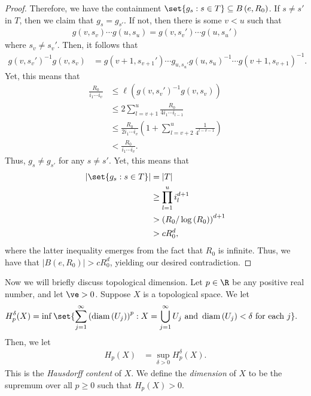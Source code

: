 \documentclass[10pt]{mypackage}
\begin{document}
\begin{proof}
  Therefore, we have the containment $\set{g_s : s\in T}\subseteq B\left( e,R_0 \right)$. If $s\neq s'$ in $T$, then we claim that $g_s = g_{s'}$. If not, then there is some $v < u$ such that 
  \begin{align*}
    g\left( v,s_v \right)\cdots g\left( u,s_u \right) = g\left( v,s_v' \right)\cdots g\left( u,s_u' \right)
  \end{align*}
  where $s_v \neq s_v'$. Then, it follows that
  \begin{align*}
    g\left( v,s_v' \right)^{-1}g\left( v,s_v \right) &= g\left( v+1,s_{v+1}' \right)\cdots g_{u,s_u'}g\left( u,s_u \right)^{-1}\cdots g\left( v+1,s_{v+1} \right)^{-1}.
  \end{align*}
  Yet, this means that
  \begin{align*}
    \frac{R_0}{i_1\cdots i_{v}} &\leq \ell\left( g\left( v,s_v' \right)^{-1}g\left( v,s_v \right) \right)\\
                                &\leq 2\sum_{l=v+1}^{u} \frac{R_0}{4i_1\cdots i_{l-1}}\\
                                &\leq \frac{R_0}{2i_1\cdots i_v}\left( 1 + \sum_{l=v+2}^{u}\frac{1}{4^{l-v-1}} \right)\\
                                & < \frac{R_0}{i_1\cdots i_v}.
  \end{align*}
  Thus, $g_s\neq g_{s'}$ for any $s\neq s'$. Yet, this means that
  \begin{align*}
    \left\vert \set{g_s : s\in T} \right\vert &= \left\vert T \right\vert\\
                                              &\geq \prod_{l=1}^{u} i_l^{d+1}\\
                                              &> \left( R_0/\log\left( R_0 \right) \right)^{d+1}\\
                                              &> cR_0^{d},
  \end{align*}
  where the latter inequality emerges from the fact that $R_0$ is infinite. Thus, we have that $\left\vert B\left( e,R_0 \right) \right\vert > cR_0^{d}$, yielding our desired contradiction.
\end{proof}
Now we will briefly discuss topological dimension. Let $p\in \R$ be any positive real number, and let $\ve > 0$. Suppose $X$ is a topological space. We let
\begin{align*}
  H_p^{\delta}(X) &= \inf\set{\sum_{j=1}^{\infty}\left( \operatorname{diam}\left( U_j \right) \right)^{p} : X = \bigcup_{j=1}^{\infty}U_j\text{ and }\operatorname{diam}\left( U_j \right) < \delta\text{ for each }j}.
\end{align*}
Then, we let
\begin{align*}
  H_p\left( X \right) &= \sup_{\delta > 0} H_p^{\delta}\left( X \right).
\end{align*}
This is the \textit{Hausdorff content} of $X$. We define the \textit{dimension} of $X$ to be the supremum over all $p\geq 0$ such that $H_p(X) > 0$.
\end{document}
